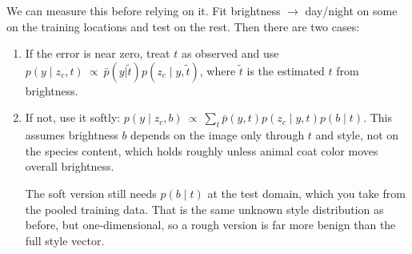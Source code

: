 \begin{itemize}
	We can measure this before relying on it. Fit brightness $\rightarrow$ day/night on some on the 
	training locations and test on the rest. Then there are two cases:
	\begin{enumerate}
	\item If the error is near zero, treat $t$ as observed and use
		$p(y \mid z_c, t) \ \propto\ \bar{p}(y|\tilde{t})p(z_c \mid y,\tilde{t})$, where $\tilde{t}$ 
		is the estimated $t$ from brightness.
	\item If not, use it softly:
		$p(y \mid z_c, b) \ \propto\ \sum_t \bar{p}(y,t)p(z_c \mid y,t)p(b \mid t)$.
		This assumes brightness $b$ depends on the image only through $t$ and style, not on the 
		species content, which holds roughly unless animal coat color moves overall brightness.

		The soft version still needs $p(b \mid t)$ at the test domain, which you take from the 
		pooled training data. That is the same unknown style distribution as before, but 
		one-dimensional, so a rough version is far more benign than the full style vector.
\end{enumerate}
\end{itemize}
